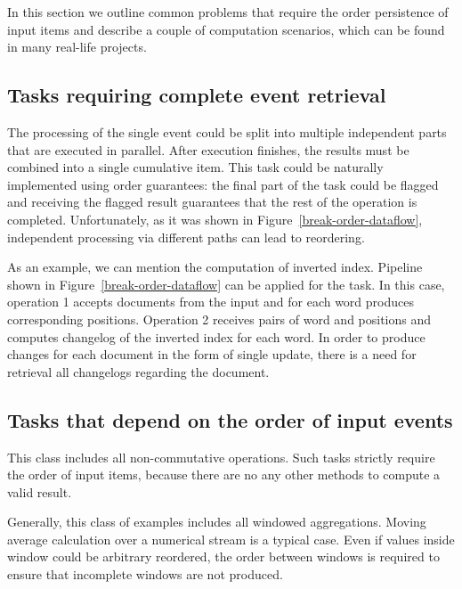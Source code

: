 
\label {fs-tasks}

In this section we outline common problems that require the order persistence of input items and describe a couple of computation scenarios, which can be found in many real-life projects.

\subsection{Tasks requiring complete event retrieval}
The processing of the single event could be split into multiple independent parts that are executed in parallel. After execution finishes, the results must be combined into a single cumulative item. This task could be naturally implemented using order guarantees: the final part of the task could be flagged and receiving the flagged result guarantees that the rest of the operation is completed. Unfortunately, as it was shown in Figure~\ref{break-order-dataflow}, independent processing via different paths can lead to reordering.

As an example, we can mention the computation of inverted index. Pipeline shown in Figure~\ref{break-order-dataflow} can be applied for the task. In this case, operation 1 accepts documents from the input and for each word produces corresponding positions. Operation 2 receives pairs of word and positions and computes changelog of the inverted index for each word. In order to produce changes for each document in the form of single update, there is a need for retrieval all changelogs regarding the document.

\subsection{Tasks that depend on the order of input events}
This class includes all non-commutative operations. Such tasks strictly require the order of input items, because there are no any other methods to compute a valid result.

Generally, this class of examples includes all windowed aggregations. Moving average calculation over a numerical stream is a typical case. Even if values inside window could be arbitrary reordered, the order between windows is required to ensure that incomplete windows are not produced.